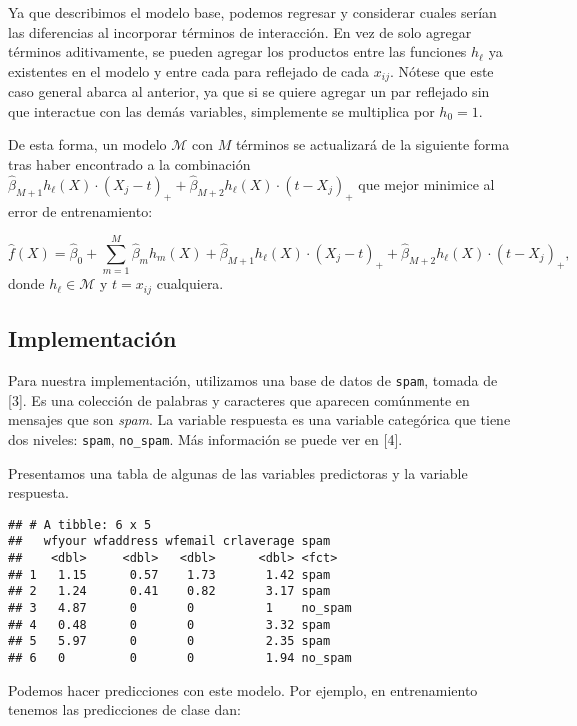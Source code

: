 \documentclass[
]{article}
\begin{document}
Ya que describimos el modelo base, podemos regresar y considerar cuales
serían las diferencias al incorporar términos de interacción. En vez de
solo agregar términos aditivamente, se pueden agregar los productos
entre las funciones \(h_\ell\) ya existentes en el modelo y entre cada
para reflejado de cada \(x_{ij}\). Nótese que este caso general abarca
al anterior, ya que si se quiere agregar un par reflejado sin que
interactue con las demás variables, simplemente se multiplica por
\(h_0 = 1\).

De esta forma, un modelo \(\mathcal{M}\) con \(M\) términos se
actualizará de la siguiente forma tras haber encontrado a la combinación
\(\hat \beta_{M+1} h_\ell(X) \cdot (X_j - t)_+ + \hat \beta_{M+2} h_\ell(X) \cdot (t-X_j)_+\)
que mejor minimice al error de entrenamiento:

\[
\hat f(X) = \hat \beta_0 + \sum_{m=1}^M \hat \beta_m h_m(X) + \hat \beta_{M+1} h_\ell(X) \cdot (X_j - t)_+ + \hat \beta_{M+2} h_\ell(X) \cdot (t-X_j)_+,
\] donde \(h_\ell \in \mathcal{M}\) y \(t = x_{ij}\) cualquiera.

\hypertarget{implementaciuxf3n}{%
\subsection{Implementación}\label{implementaciuxf3n}}

Para nuestra implementación, utilizamos una base de datos de
\texttt{spam}, tomada de {[}3{]}. Es una colección de palabras y
caracteres que aparecen comúnmente en mensajes que son \emph{spam}. La
variable respuesta es una variable categórica que tiene dos niveles:
\texttt{spam}, \texttt{no\_spam}. Más información se puede ver en
{[}4{]}.

Presentamos una tabla de algunas de las variables predictoras y la
variable respuesta.

\begin{verbatim}
## # A tibble: 6 x 5
##   wfyour wfaddress wfemail crlaverage spam   
##    <dbl>     <dbl>   <dbl>      <dbl> <fct>  
## 1   1.15      0.57    1.73       1.42 spam   
## 2   1.24      0.41    0.82       3.17 spam   
## 3   4.87      0       0          1    no_spam
## 4   0.48      0       0          3.32 spam   
## 5   5.97      0       0          2.35 spam   
## 6   0         0       0          1.94 no_spam
\end{verbatim}

Podemos hacer predicciones con este modelo. Por ejemplo, en
entrenamiento tenemos las predicciones de clase dan:
\end{document}
